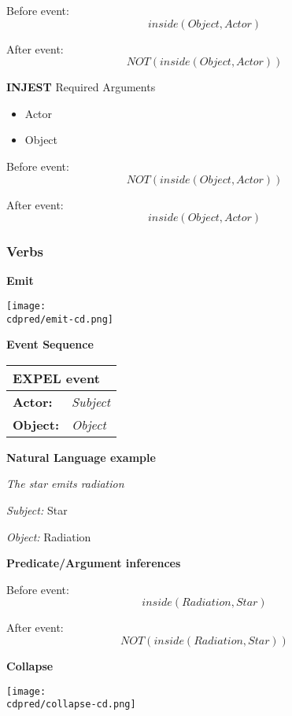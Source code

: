\documentclass[\mainfile]{subfiles}
\begin{document}
Before event:
\[inside(Object, Actor)\]

After event:
\[NOT(inside(Object, Actor))\]

\textbf{INJEST}
Required Arguments
\begin{itemize}
	\item Actor
    \item Object
\end{itemize}


Before event:
\[NOT(inside(Object, Actor))\]

After event:
\[inside(Object, Actor)\]


\subsubsection{Verbs}
\textbf{Emit}
\begin{center}
	\texttt{[image: \\cdpred/emit-cd.png]}
    
	\bigskip

\end{center}

\textbf{Event Sequence}
\begin{center}

    \begin{tabular}{l l}
      \toprule
      \multicolumn{2}{l}{\textbf{EXPEL event}}\\
      \hline
      \textbf{Actor:} & \textit{Subject}\\
      \textbf{Object:} & \textit{Object}\\
      \bottomrule
    \end{tabular}
\end{center}

\textbf{Natural Language example}

\textit{The star emits radiation}

\textit{Subject:} Star

\textit{Object:} Radiation

\bigskip
\textbf{Predicate/Argument inferences}

Before event:
\[inside(Radiation, Star)\]

After event:
\[NOT(inside(Radiation, Star))\]

\newpage

\textbf{Collapse}
\begin{center}
	\texttt{[image: \\cdpred/collapse-cd.png]}
\end{center}
	\bigskip
    
\end{document}

